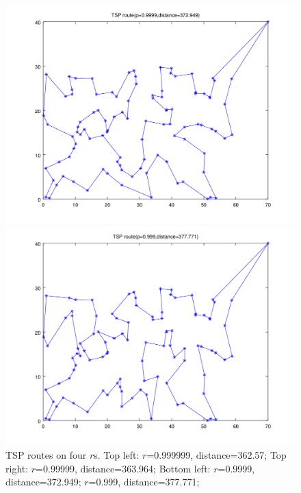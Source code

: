 \documentclass[10.5pt,a4paper]{article}
\begin{document}
\begin{figure}[H]
\begin{minipage}[b]{0.5\linewidth}
\includegraphics[width=\textwidth]{../result/TSP_route_372.png}
\end{minipage}
\hspace{0.5cm}
\begin{minipage}[b]{0.5\linewidth}
\centering
\includegraphics[width=\textwidth]{../result/TSP_route_377.png}
\end{minipage}
\caption{TSP routes on four $r$s. Top left: $r$=0.999999, distance=362.57; Top right: $r$=0.99999, distance=363.964; Bottom left: $r$=0.9999, distance=372.949; $r$=0.999, distance=377.771;}
\label{fig:1}
\end{figure}
\end{document}
